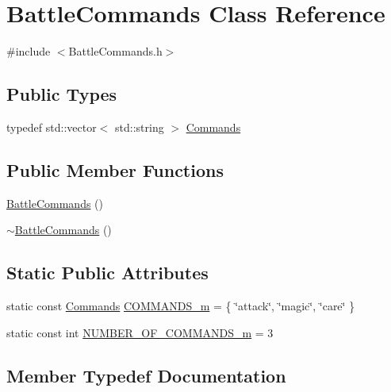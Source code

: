 \hypertarget{class_battle_commands}{}\section{Battle\+Commands Class Reference}
\label{class_battle_commands}


{\ttfamily \#include $<$Battle\+Commands.\+h$>$}

\subsection*{Public Types}
\begin{DoxyCompactItemize}
\item 
typedef std\+::vector$<$ std\+::string $>$ \hyperlink{class_battle_commands_ad7112c7a7d768a36302631667bd62b17}{Commands}
\end{DoxyCompactItemize}
\subsection*{Public Member Functions}
\begin{DoxyCompactItemize}
\item 
\hyperlink{class_battle_commands_a2c466c46c4b4884c34502d9ac976846e}{Battle\+Commands} ()
\item 
\hyperlink{class_battle_commands_a74617b7c7d0ea2211f7e5236171b6ca6}{$\sim$\+Battle\+Commands} ()
\end{DoxyCompactItemize}
\subsection*{Static Public Attributes}
\begin{DoxyCompactItemize}
\item 
static const \hyperlink{class_battle_commands_ad7112c7a7d768a36302631667bd62b17}{Commands} \hyperlink{class_battle_commands_ad187150249ca899f0f6cd16cd8052d0f}{C\+O\+M\+M\+A\+N\+D\+S\+\_\+m} = \{ \char`\"{}attack\char`\"{}, \char`\"{}magic\char`\"{}, \char`\"{}care\char`\"{} \}
\item 
static const int \hyperlink{class_battle_commands_afdec7871d4e52ef80316212c49c80dcd}{N\+U\+M\+B\+E\+R\+\_\+\+O\+F\+\_\+\+C\+O\+M\+M\+A\+N\+D\+S\+\_\+m} = 3
\end{DoxyCompactItemize}


\subsection{Member Typedef Documentation}
\hypertarget{class_battle_commands_ad7112c7a7d768a36302631667bd62b17}{}
